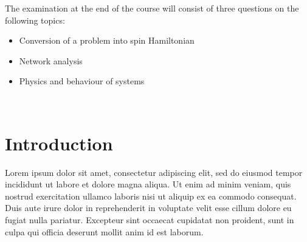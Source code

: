 \documentclass{article}
\begin{document}
  \noindent The examination at the end of the course will consist of three questions on the following topics: 

  \begin{itemize}
    \item Conversion of a problem into spin Hamiltonian 
    \item Network analysis 
    \item Physics and behaviour of systems
  \end{itemize}
  
  \ 

  \section{Introduction}
  
  Lorem ipsum dolor sit amet, consectetur adipiscing elit, sed do eiusmod tempor incididunt ut labore et dolore magna aliqua. Ut enim ad minim veniam, quis nostrud exercitation ullamco laboris nisi ut aliquip ex ea commodo consequat. Duis aute irure dolor in reprehenderit in voluptate velit esse cillum dolore eu fugiat nulla pariatur. Excepteur sint occaecat cupidatat non proident, sunt in culpa qui officia deserunt mollit anim id est laborum. 

  
\end{document}
